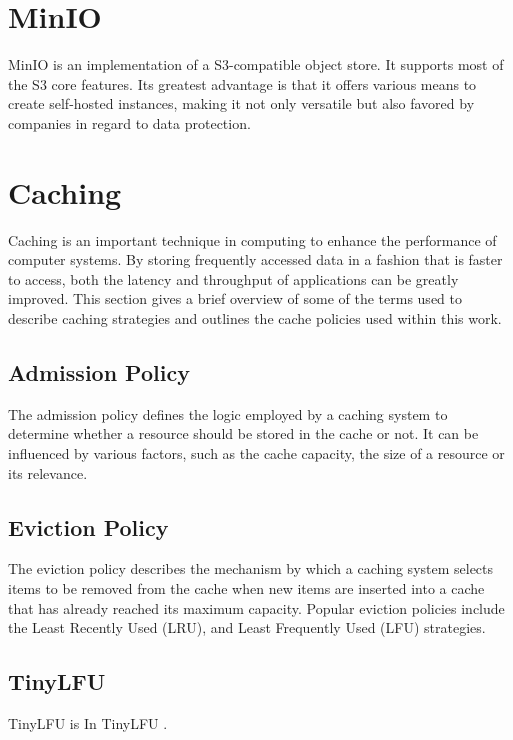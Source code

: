 \section{MinIO}
MinIO is an implementation of a S3-compatible object store. It supports most of the S3 core features. Its greatest advantage is that it offers various means to create self-hosted instances, making it not only versatile but also favored by companies in regard to data protection.

\section{Caching}

Caching is an important technique in computing to enhance the performance of computer systems. By storing frequently accessed data in a fashion that is faster to access, both the latency and throughput of applications can be greatly improved.
This section gives a brief overview of some of the terms used to describe caching strategies and outlines the cache policies used within this work.

\subsection{Admission Policy}
The admission policy defines the logic employed by a caching system to determine whether a resource should be stored in the cache or not. It can be influenced by various factors, such as the cache capacity, the size of a resource or its relevance.

\subsection{Eviction Policy}
The eviction policy describes the mechanism by which a caching system selects items to be removed from the cache when new items are inserted into a cache that has already reached its maximum capacity. Popular eviction policies include the Least Recently Used (LRU), and Least Frequently Used (LFU) strategies.

\subsection{TinyLFU}
\label{tiny_lfu}
TinyLFU is 
In TinyLFU .

